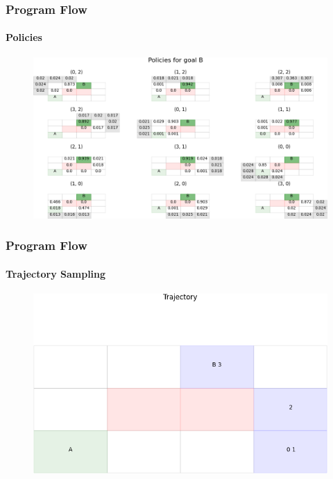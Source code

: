 \documentclass[11pt]{beamer}
\begin{document}
\begin{frame}
	\frametitle{Program Flow}
	\framesubtitle{Policies}
	\begin{figure}
		\centering
		\includegraphics[width=\linewidth]{res/B_policies}
	\end{figure}
	
\end{frame}

\begin{frame}
	\frametitle{Program Flow}
	\framesubtitle{Trajectory Sampling}
	\begin{figure}
		\centering
		\includegraphics[width=\linewidth]{res/traj}
	\end{figure}
	
\end{frame}
\end{document}
